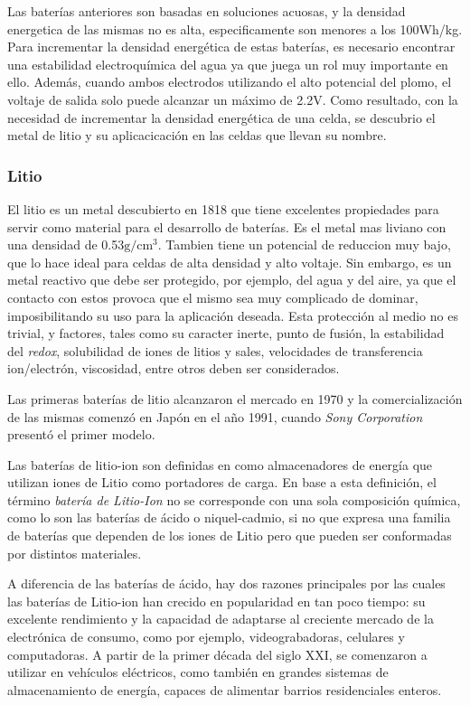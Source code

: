 \documentclass[10pt,a4paper]{article}
\begin{document}
\noindent Las baterías anteriores son basadas en soluciones acuosas, y la
densidad energetica de las mismas no es alta, especificamente son menores a los
100Wh/kg. Para incrementar la densidad energética de estas baterías, es
necesario encontrar una estabilidad electroquímica del agua ya que juega un rol
muy importante en ello. Además, cuando ambos electrodos utilizando el alto
potencial del plomo, el voltaje de salida solo puede alcanzar un máximo de 2.2V.
Como resultado, con la necesidad de incrementar la densidad energética de una
celda, se descubrio el metal de litio y su aplicacicación en las celdas que
llevan su nombre.

\subsubsection{Litio}

El litio es un metal descubierto en 1818 que tiene excelentes propiedades para
servir como material para el desarrollo de baterías.  Es el metal mas liviano
con una densidad de 0.53$\mathrm{g/cm^3}$.  Tambien tiene un potencial de
reduccion muy bajo, que lo hace ideal para celdas de alta densidad y alto
voltaje. Sin embargo, es un metal reactivo que debe ser protegido, por ejemplo,
del agua y del aire, ya que el contacto con estos provoca que el mismo sea muy
complicado de dominar, imposibilitando su uso para la aplicación deseada.  Esta
protección al medio no es trivial, y factores, tales como su caracter inerte,
punto de fusión, la estabilidad del \emph{redox}, solubilidad de iones de litios
y sales, velocidades de transferencia ion/electrón, viscosidad, entre otros
deben ser considerados.

\noindent Las primeras baterías de litio alcanzaron el mercado en 1970 y la
comercialización de las mismas comenzó en Japón en el año 1991, cuando
\emph{Sony Corporation} presentó el primer modelo.

\noindent Las baterías de litio-ion son definidas en \cite{def_liion} como
almacenadores de energía que utilizan iones de Litio como portadores de carga.
En base a esta definición, el término \emph{batería de Litio-Ion} no se
corresponde con una sola composición química, como lo son las baterías de ácido
o niquel-cadmio, si no que expresa una familia de baterías que dependen de los
iones de Litio pero que pueden ser conformadas por distintos materiales.

\noindent A diferencia de las baterías de ácido, hay dos razones principales por
las cuales las baterías de Litio-ion han crecido en popularidad en tan poco
tiempo: su excelente rendimiento y la capacidad de adaptarse al creciente
mercado de la electrónica de consumo, como por ejemplo, videograbadoras,
celulares y computadoras. A partir de la primer década del siglo XXI, se
comenzaron a utilizar en vehículos eléctricos, como también en grandes sistemas
de almacenamiento de energía, capaces de alimentar barrios residenciales
enteros.
\end{document}
